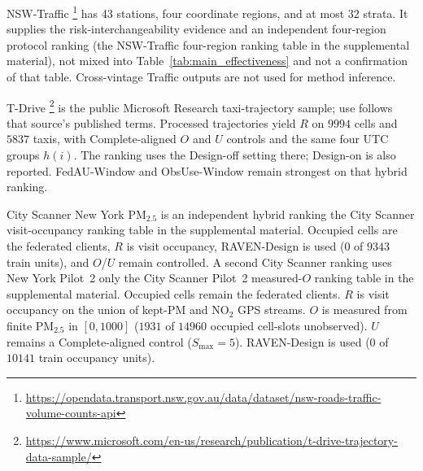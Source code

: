 \documentclass[letterpaper,journal]{IEEEtran}
\begin{document}
NSW-Traffic
\cite{tfnsw2024traffic}\footnote{\url{https://opendata.transport.nsw.gov.au/data/dataset/nsw-roads-traffic-volume-counts-api}}
has 43 stations, four coordinate regions, and at most 32 strata.  It
supplies the risk-interchangeability evidence and an independent four-region protocol ranking
(the NSW-Traffic four-region ranking table in the supplemental material), not mixed into
Table~\ref{tab:main_effectiveness} and not a confirmation of that table.  Cross-vintage Traffic outputs are
not used for method inference.

T-Drive
\cite{yuan2010tdrive}\footnote{\url{https://www.microsoft.com/en-us/research/publication/t-drive-trajectory-data-sample/}}
is the public Microsoft Research taxi-trajectory sample; use follows that
source's published terms.  Processed trajectories yield $R$ on $9994$
cells and $5837$ taxis, with Complete-aligned $O$ and $U$ controls and
the same four UTC groups $h(i)$.  The ranking uses the Design-off setting
there; Design-on is also reported.  FedAU-Window and ObsUse-Window remain strongest
on that hybrid ranking.

City Scanner New York {PM}$_{2.5}$ is an independent hybrid ranking
the City Scanner visit-occupancy ranking table in the supplemental material.  Occupied cells are the federated
clients, $R$ is visit occupancy, RAVEN-Design is used ($0$ of $9343$ train
units), and $O$/$U$ remain controlled.
A second City Scanner ranking uses New York Pilot~2 only
the City Scanner Pilot~2 measured-$O$ ranking table in the supplemental material.
Occupied cells remain the federated clients.
$R$ is visit occupancy on the union of kept-{PM} and {NO}$_2$ GPS streams.
$O$ is measured from finite {PM}$_{2.5}$ in $[0,1000]$
($1931$ of $14960$ occupied cell-slots unobserved).
$U$ remains a Complete-aligned control ($S_{\max}=5$).
RAVEN-Design is used ($0$ of $10141$ train occupancy units).
\end{document}

